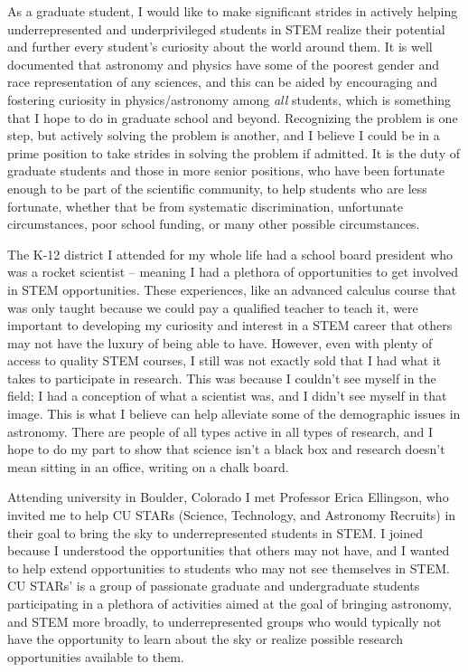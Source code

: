 \documentclass[11pt,letterpaper]{article}
\begin{document}
As a graduate student, I would like to make significant strides in actively helping underrepresented and underprivileged students in STEM realize their potential and further every student's curiosity about the world around them. It is well documented that astronomy and physics have some of the poorest gender and race representation of any sciences, and this can be aided by encouraging and fostering curiosity in physics/astronomy among \textit{all} students, which is something that I hope to do in graduate school and beyond. Recognizing the problem is one step, but actively solving the problem is another, and I believe I could be in a prime position to take strides in solving the problem if admitted. It is the duty of graduate students and those in more senior positions, who have been fortunate enough to be part of the scientific community, to help students who are less fortunate, whether that be from systematic discrimination, unfortunate circumstances, poor school funding, or many other possible circumstances. 

The K-12 district I attended for my whole life had a school board president who was a rocket scientist -- meaning I had a plethora of opportunities to get involved in STEM opportunities. These experiences, like an advanced calculus course that was only taught because we could pay a qualified teacher to teach it, were important to developing my curiosity and interest in a STEM career that others may not have the luxury of being able to have. However, even with plenty of access to quality STEM courses, I still was not exactly sold that I had what it takes to participate in research. This was because I couldn't see myself in the field; I had a conception of what a scientist was, and I didn't see myself in that image. This is what I believe can help alleviate some of the demographic issues in astronomy. There are people of all types active in all types of research, and I hope to do my part to show that science isn't a black box and research doesn't mean sitting in an office, writing on a chalk board. 

Attending university in Boulder, Colorado I met Professor Erica Ellingson, who invited me to help CU STARs (Science, Technology, and Astronomy Recruits) in their goal to bring the sky to underrepresented students in STEM. I joined because I understood the opportunities that others may not have, and I wanted to help extend opportunities to students who may not see themselves in STEM. CU STARs’ is a group of passionate graduate and undergraduate students participating in a plethora of activities aimed at the goal of bringing astronomy, and STEM more broadly, to underrepresented groups who would typically not have the opportunity to learn about the sky or realize possible research opportunities available to them. 
\end{document}

